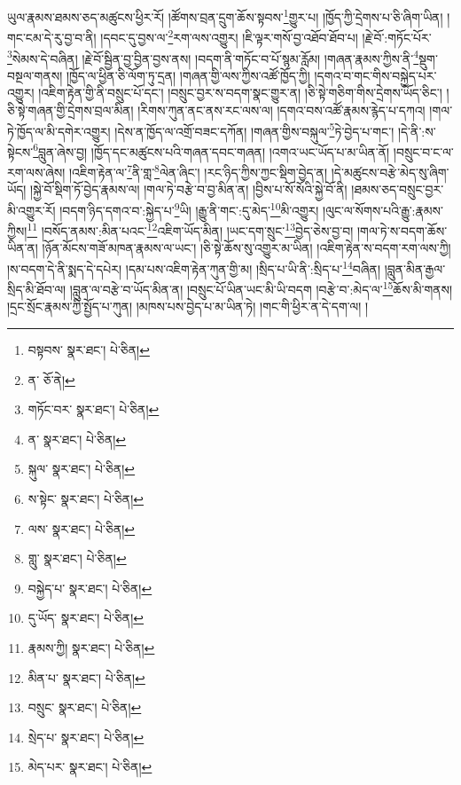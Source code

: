 ཡུལ་རྣམས་ཐམས་ཅད་མཚུངས་ཕྱིར་རོ། །ཚོགས་བྲན་དྲུག་ཆོས་སྟབས་\footnote{བསྟབས་  སྣར་ཐང་།  པེ་ཅིན། }གྱུར་པ། །ཁྱོད་ཀྱི་དྲེགས་པ་ཅི་ཞིག་ཡིན། །གང་ངམ་དེ་རུ་བྱ་བ་ནི། །དབང་དུ་བྱས་ལ་\footnote{ན་  ཅོ་ནེ། }རག་ལས་འགྱུར། །ཇི་ལྟར་གསོ་བྱ་འཐོབ་ཐོབ་པ། །རྗེ་བོ་:གཏོང་པོར་\footnote{གཏོང་བར་  སྣར་ཐང་།  པེ་ཅིན། }སེམས་དེ་བཞིན། །རྗེ་བོ་སྦྱིན་བྱ་བྱིན་བྱས་ནས། །བདག་ནི་གཏོང་བ་པོ་སྙམ་རློམ། །གཞན་རྣམས་ཀྱིས་ནི་\footnote{ན་  སྣར་ཐང་།  པེ་ཅིན། }སྡུག་བསྔལ་གནས། །ཁྱོད་ལ་ཕྱིན་ཅི་ལོག་ཏུ་དྲན། །གཞན་གྱི་ལས་ཀྱིས་འཚོ་ཁྱོད་ཀྱི། །དགའ་བ་གང་གིས་བསྐྱེད་པར་འགྱུར། །འཇིག་རྟེན་གྱི་ནི་བསྲུང་པོ་དང་། །བསྲུང་བྱར་ས་བདག་སྣང་གྱུར་ན། །ཅི་སྟེ་གཅིག་གིས་དྲེགས་ཡོད་ཅིང་། །ཅི་སྟེ་གཞན་གྱི་དྲེགས་བྲལ་མིན། །རིགས་ཀུན་ནང་ནས་རང་ལས་ལ། །དགའ་བས་འཚོ་རྣམས་རྙེད་པ་དཀའ། །གལ་ཏེ་ཁྱོད་ལ་མི་དགེར་འགྱུར། །དེས་ན་ཁྱོད་ལ་འགྲོ་བཟང་དཀོན། །གཞན་གྱིས་བསྐུལ་\footnote{སྐུལ་  སྣར་ཐང་།  པེ་ཅིན། }ཏེ་བྱེད་པ་གང་། །དེ་ནི་:ས་སྟེངས་\footnote{ས་སྟེང་  སྣར་ཐང་།  པེ་ཅིན། }བླུན་ཞེས་བྱ། །ཁྱོད་དང་མཚུངས་པའི་གཞན་དབང་གཞན། །འགའ་ཡང་ཡོད་པ་མ་ཡིན་ནོ། །བསྲུང་བ་ང་ལ་རག་ལས་ཞེས། །འཇིག་རྟེན་ལ་\footnote{ལས་  སྣར་ཐང་།  པེ་ཅིན། }ནི་གླ་\footnote{གླུ་  སྣར་ཐང་།  པེ་ཅིན། }ལེན་ཞིང་། །རང་ཉིད་ཀྱིས་ཀྱང་སྡིག་བྱེད་ན། །དེ་མཚུངས་བརྩེ་མེད་སུ་ཞིག་ཡོད། །སྐྱེ་བོ་སྡིག་ཏོ་བྱེད་རྣམས་ལ། །གལ་ཏེ་བརྩེ་བ་བྱ་མིན་ན། །བྱིས་པ་སོ་སོའི་སྐྱེ་བོ་ནི། །ཐམས་ཅད་བསྲུང་བྱར་མི་འགྱུར་རོ། །བདག་ཉིད་དགའ་བ་:སྐྱེད་པ་\footnote{བསྐྱེད་པ་  སྣར་ཐང་།  པེ་ཅིན། }ཡི། །རྒྱུ་ནི་གང་:དུ་མེད་\footnote{དུ་ཡོད་  སྣར་ཐང་།  པེ་ཅིན། }མི་འགྱུར། །ལུང་ལ་སོགས་པའི་རྒྱུ་:རྣམས་ཀྱིས།\footnote{རྣམས་ཀྱི།  སྣར་ཐང་།  པེ་ཅིན། } །བསོད་ནམས་:མིན་པའང་\footnote{མིན་པ་  སྣར་ཐང་།  པེ་ཅིན། }འཇིག་ཡོད་མིན། །ཡང་དག་སྲུང་\footnote{བསྲུང་  སྣར་ཐང་།  པེ་ཅིན། }བྱེད་ཅེས་བྱ་བ། །གལ་ཏེ་ས་བདག་ཆོས་ཡིན་ན། །ཉོན་མོངས་གཟོ་མཁན་རྣམས་ལ་ཡང་། །ཅི་སྟེ་ཆོས་སུ་འགྱུར་མ་ཡིན། །འཇིག་རྟེན་ས་བདག་རག་ལས་ཀྱི། །ས་བདག་དེ་ནི་སྨད་དེ་དཔེར། །དམ་པས་འཇིག་རྟེན་ཀུན་གྱི་མ། །སྲིད་པ་ཡི་ནི་:སྲིད་པ་\footnote{སྲེད་པ་  སྣར་ཐང་།  པེ་ཅིན། }བཞིན། །བླུན་མིན་རྒྱལ་སྲིད་མི་ཐོབ་ལ། །བླུན་ལ་བརྩེ་བ་ཡོད་མིན་ན། །བསྲུང་པོ་ཡིན་ཡང་མི་ཡི་བདག །བརྩེ་བ་:མེད་ལ་\footnote{མེད་པར་  སྣར་ཐང་།  པེ་ཅིན། }ཆོས་མི་གནས། །དྲང་སྲོང་རྣམས་ཀྱི་སྤྱོད་པ་ཀུན། །མཁས་པས་བྱེད་པ་མ་ཡིན་ཏེ། །གང་གི་ཕྱིར་ན་དེ་དག་ལ། །
